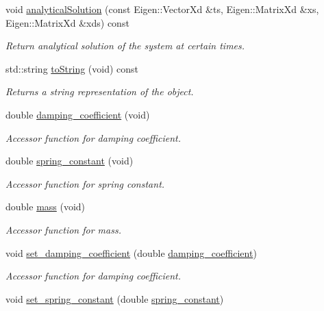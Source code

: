 \begin{DoxyCompactItemize}
void \hyperlink{classDmpBbo_1_1SpringDamperSystem_ab6600b58b35bc9e66673d16f68e2e919}{analytical\+Solution} (const Eigen\+::\+Vector\+Xd \&ts, Eigen\+::\+Matrix\+Xd \&xs, Eigen\+::\+Matrix\+Xd \&xds) const 
\begin{DoxyCompactList}\small\item\em Return analytical solution of the system at certain times. \end{DoxyCompactList}\item 
std\+::string \hyperlink{classDmpBbo_1_1SpringDamperSystem_a1aca816b42cf0d36118be0ab91120d77}{to\+String} (void) const 
\begin{DoxyCompactList}\small\item\em Returns a string representation of the object. \end{DoxyCompactList}\item 
double \hyperlink{classDmpBbo_1_1SpringDamperSystem_a1e0acb1d6298104e74f81f53768f5bf1}{damping\+\_\+coefficient} (void)
\begin{DoxyCompactList}\small\item\em Accessor function for damping coefficient. \end{DoxyCompactList}\item 
double \hyperlink{classDmpBbo_1_1SpringDamperSystem_a4afd1caf44ce68f2747d8fa8a1388b0a}{spring\+\_\+constant} (void)
\begin{DoxyCompactList}\small\item\em Accessor function for spring constant. \end{DoxyCompactList}\item 
double \hyperlink{classDmpBbo_1_1SpringDamperSystem_a387fcfdb067c6de3be9bfd61b868b839}{mass} (void)
\begin{DoxyCompactList}\small\item\em Accessor function for mass. \end{DoxyCompactList}\item 
void \hyperlink{classDmpBbo_1_1SpringDamperSystem_a0b6f58851f4a8fc8b433936cff4c3e7e}{set\+\_\+damping\+\_\+coefficient} (double \hyperlink{classDmpBbo_1_1SpringDamperSystem_a1e0acb1d6298104e74f81f53768f5bf1}{damping\+\_\+coefficient})
\begin{DoxyCompactList}\small\item\em Accessor function for damping coefficient. \end{DoxyCompactList}\item 
void \hyperlink{classDmpBbo_1_1SpringDamperSystem_a8844968245473d1fedd2a2b632fb074a}{set\+\_\+spring\+\_\+constant} (double \hyperlink{classDmpBbo_1_1SpringDamperSystem_a4afd1caf44ce68f2747d8fa8a1388b0a}{spring\+\_\+constant})

\end{DoxyCompactItemize}
